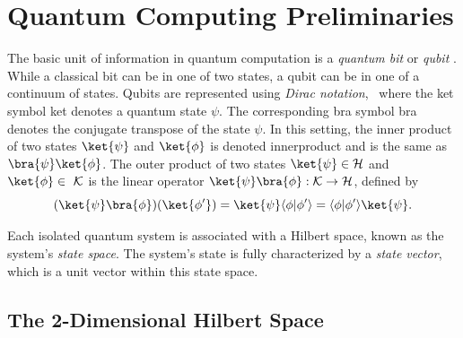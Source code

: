 






\section{Quantum Computing Preliminaries} \label{sec:Quantum Computing Preliminaries}

The basic unit of information in quantum computation is a \emph{quantum bit} or \emph{qubit} \cite{perdrix2008quantum}. While a classical bit can be in one of two states, a qubit can be in one of a continuum of states. Qubits are represented using \emph{Dirac notation},  where the ket symbol \gls{ket} denotes a quantum state $\psi$. The corresponding bra symbol \gls{bra} denotes the conjugate transpose of the state $\psi$. In this setting, the inner product of two states $\ket{\psi}$ and $\ket{\phi}$ is denoted \gls{innerproduct} and is the same as $\bra{\psi} \ket{\phi}$. The outer product of two states $\ket{\psi} \in \HilbH$ and $\ket{\phi} \in  \HilbK$ is the linear operator $\ket{\psi}\bra{\phi} : \HilbK \to \HilbH$, defined by
\begin{equation*} \label{eq:outer-product}
(\ket{\psi}\bra{\phi})(\ket{\phi'}) = \ket{\psi} \langle \phi | \phi' \rangle = \langle \phi | \phi' \rangle \ket{\psi}.
\end{equation*}

\begin{definition}
  Each isolated quantum system is associated with a Hilbert space, known as the system's \emph{state space}. The system's state is fully characterized by a \emph{state vector}, which is a unit vector within this state space.
\end{definition}

\subsection{The 2-Dimensional Hilbert Space} \label{subsec:hilb2D}
 

